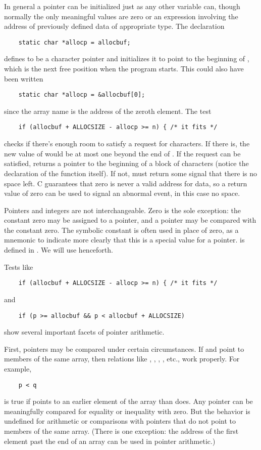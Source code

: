 In general a pointer can be initialized just as any other variable can, though normally the only meaningful values are zero or an expression involving the address of previously defined data of appropriate type.
The declaration
\begin{lstlisting}
    static char *allocp = allocbuf;
\end{lstlisting}
defines  to be a character pointer and initializes it to point to the beginning of , which is the next free position when the program starts.
This could also have been written
\begin{lstlisting}
    static char *allocp = &allocbuf[0];
\end{lstlisting}
since the array name is the address of the zeroth element.
The test
\begin{lstlisting}
    if (allocbuf + ALLOCSIZE - allocp >= n) { /* it fits */
\end{lstlisting}
checks if there's enough room to satisfy a request for  characters. If there is, the new value of  would be at most one beyond the end of .
If the request can be satisfied,  returns a pointer to the beginning of a block of characters (notice the declaration of the function itself).
If not,  must return some signal that there is no space left.
C guarantees that zero is never a valid address for data, so a return value of zero can be used to signal an abnormal event, in this case no space.

Pointers and integers are not interchangeable. Zero is the sole exception: the constant zero may be assigned to a pointer, and a pointer may be compared with the constant zero.
The symbolic constant  is often used in place of zero, as a mnemonic to indicate more clearly that this is a special value for a pointer.  is defined in . We will use  henceforth.

Tests like
\begin{lstlisting}
    if (allocbuf + ALLOCSIZE - allocp >= n) { /* it fits */
\end{lstlisting}
and
\begin{lstlisting}
    if (p >= allocbuf && p < allocbuf + ALLOCSIZE)
\end{lstlisting}
show several important facets of pointer arithmetic.

First, pointers may be compared under certain circumstances. If  and  point to members of the same array, then relations like \code{==}, \code{!=}, \code{<}, \code{>=}, etc., work properly. For example,
\begin{lstlisting}
    p < q
\end{lstlisting}
is true if  points to an earlier element of the array than  does.
Any pointer can be meaningfully compared for equality or inequality with zero.
But the behavior is undefined for arithmetic or comparisons with pointers that do not point to members of the same array.
(There is one exception: the address of the first element past the end of an array can be used in pointer arithmetic.)

